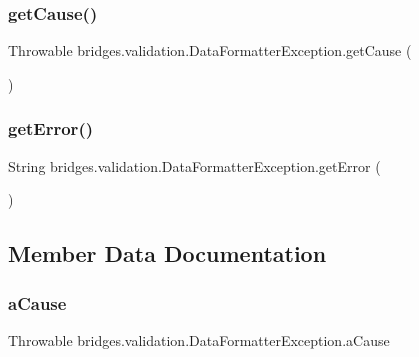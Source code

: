 \subsubsection{\texorpdfstring{get\+Cause()}{getCause()}}
{\footnotesize\ttfamily Throwable bridges.\+validation.\+Data\+Formatter\+Exception.\+get\+Cause (\begin{DoxyParamCaption}{ }\end{DoxyParamCaption})}

\hypertarget{classbridges_1_1validation_1_1_data_formatter_exception_ad60457ab04769d2c80e6ba77a6307ce1}{}\label{classbridges_1_1validation_1_1_data_formatter_exception_ad60457ab04769d2c80e6ba77a6307ce1} 
\subsubsection{\texorpdfstring{get\+Error()}{getError()}}
{\footnotesize\ttfamily String bridges.\+validation.\+Data\+Formatter\+Exception.\+get\+Error (\begin{DoxyParamCaption}{ }\end{DoxyParamCaption})}



\subsection{Member Data Documentation}
\hypertarget{classbridges_1_1validation_1_1_data_formatter_exception_ad2fdeb878690d9fc23f1316f55696ffd}{}\label{classbridges_1_1validation_1_1_data_formatter_exception_ad2fdeb878690d9fc23f1316f55696ffd} 
\subsubsection{\texorpdfstring{a\+Cause}{aCause}}
{\footnotesize\ttfamily Throwable bridges.\+validation.\+Data\+Formatter\+Exception.\+a\+Cause}

\hypertarget{classbridges_1_1validation_1_1_data_formatter_exception_a8cab4688a8a80a0575bcda28e6ac7b8c}{}\label{classbridges_1_1validation_1_1_data_formatter_exception_a8cab4688a8a80a0575bcda28e6ac7b8c} 
